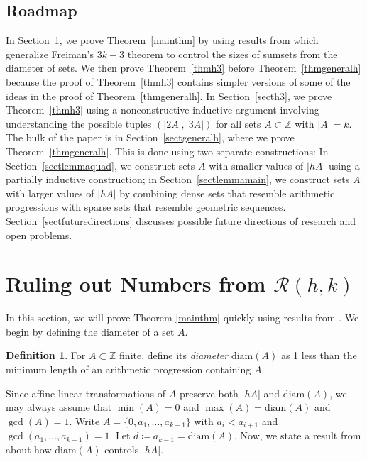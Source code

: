 \documentclass[10pt,a4paper]{article}
\theoremstyle{definition}
\newtheorem{definition}[theorem]{Definition}
\theoremstyle{remark}
\numberwithin{equation}{section}
\numberwithin{theorem}{section}
\newcommand{\Z}{\mathbb{Z}}
\newcommand{\calr}{\mathcal{R}}
\newcommand{\diam}{\mathrm{diam}}
\begin{document}
\subsection{Roadmap}
In Section~\ref{sectexcluding}, we prove Theorem~\ref{mainthm} by using results from \cite{Lev96} which generalize Freiman's $3k-3$ theorem to control the sizes of sumsets from the diameter of sets. We then prove Theorem~\ref{thmh3} before Theorem~\ref{thmgeneralh} because the proof of Theorem~\ref{thmh3} contains simpler versions of some of the ideas in the proof of Theorem~\ref{thmgeneralh}. In Section~\ref{secth3}, we prove Theorem~\ref{thmh3} using a nonconstructive inductive argument involving understanding the possible tuples $(|2A|,|3A|)$ for all sets $A \subset \Z$ with $|A| = k$. The bulk of the paper is in Section~\ref{sectgeneralh}, where we prove Theorem~\ref{thmgeneralh}. This is done using two separate constructions: In Section~\ref{sectlemmaquad}, we construct sets $A$ with smaller values of $|hA|$ using a partially inductive construction; in Section~\ref{sectlemmamain}, we construct sets $A$ with larger values of $|hA|$ by combining dense sets that resemble arithmetic progressions with sparse sets that resemble geometric sequences. Section~\ref{sectfuturedirections} discusses possible future directions of research and open problems.



\section{Ruling out Numbers from \texorpdfstring{$\calr(h,k)$}{R(h,k)}}\label{sectexcluding}
In this section, we will prove Theorem \ref{mainthm} quickly using results from \cite{Lev96}. We begin by defining the diameter of a set $A$. 
\begin{definition}
    For $A \subset \Z$ finite, define its \emph{diameter} $\diam(A)$ as 1 less than the minimum length of an arithmetic progression containing $A$.
\end{definition}
Since affine linear transformations of $A$ preserve both $|hA|$ and $\diam(A)$, we may always assume that $\min(A) = 0$ and $\max(A) = \diam(A)$ and $\gcd(A) = 1$. Write $A = \{0,a_1,\ldots,a_{k-1}\}$ with $a_i < a_{i+1}$ and $\gcd(a_1,\ldots,a_{k-1})=1$. Let $d \coloneq a_{k-1} = \diam(A)$. Now, we state a result from \cite{Lev96} about how $\diam(A)$ controls $|hA|$.
\end{document}
